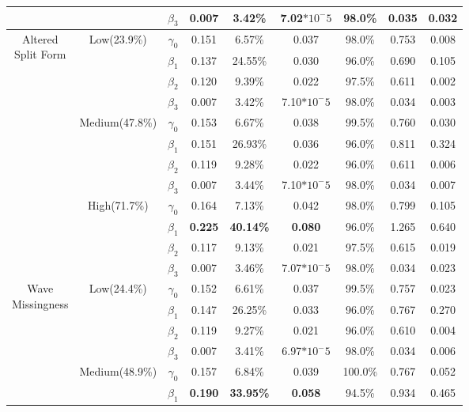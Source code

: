 \documentclass{svjour3}\usepackage[]{graphicx}\usepackage[]{color}
\begin{document}
\begin{table}[p]
\begin{tabular}{c|c|c|cccccc}
		&& $\beta_3$ & 0.007 & 3.42\% & 7.02$*10^-5$ & 98.0\% & 0.035 & 0.032 \\
		\midrule
		\midrule
		\multirow{12}{*}{\parbox{1.75cm}{Altered \\ Split Form}}
		& \multirow{4}{*}{Low(23.9\%)}
		& $\gamma_0$ & 0.151 & 6.57\% & 0.037 & 98.0\% & 0.753 & 0.008 \\
		&& $\beta_1$ & 0.137 & 24.55\% & 0.030 & 96.0\% & 0.690 & 0.105 \\
		&& $\beta_2$ & 0.120 & 9.39\% & 0.022 & 97.5\% & 0.611 & 0.002 \\
		&& $\beta_3$ & 0.007 & 3.42\% & 7.10$*10^-5$ & 98.0\% & 0.034 & 0.003 \\ \cline{2-9} \noalign{\smallskip}
		&\multirow{4}{*}{Medium(47.8\%)}
		& $\gamma_0$ & 0.153 & 6.67\% & 0.038 & 99.5\% & 0.760 & 0.030 \\
		&& $\beta_1$ & 0.151 & 26.93\% & 0.036 & 96.0\% & 0.811 & 0.324 \\
		&& $\beta_2$ & 0.119 & 9.28\% & 0.022 & 96.0\% & 0.611 & 0.006 \\
		&& $\beta_3$ & 0.007 & 3.44\% & 7.10$*10^-5$ & 98.0\% & 0.034 & 0.007 \\ \cline{2-9} \noalign{\smallskip}
		& \multirow{4}{*}{High(71.7\%)}
		& $\gamma_0$ & 0.164 & 7.13\% & 0.042 & 98.0\% & 0.799 & 0.105 \\
		&& $\beta_1$ & \textbf{0.225} & \textbf{40.14\%} & \textbf{0.080} & 96.0\% & 1.265 & 0.640 \\
		&& $\beta_2$ & 0.117 & 9.13\% & 0.021 & 97.5\% & 0.615 & 0.019 \\
		&& $\beta_3$ & 0.007 & 3.46\% & 7.07$*10^-5$ & 98.0\% & 0.034 & 0.023 \\
		\midrule
		\midrule
		\multirow{12}{*}{\parbox{1.75cm}{Wave \\ Missingness}}
		& \multirow{4}{*}{Low(24.4\%)}
		& $\gamma_0$ & 0.152 & 6.61\% & 0.037 & 99.5\% & 0.757 & 0.023 \\
		&& $\beta_1$ & 0.147 & 26.25\% & 0.033 & 96.0\% & 0.767 & 0.270 \\
		&& $\beta_2$ & 0.119 & 9.27\% & 0.021 & 96.0\% & 0.610 & 0.004 \\
		&& $\beta_3$ & 0.007 & 3.41\% & 6.97$*10^-5$ & 98.0\% & 0.034 & 0.006 \\ \cline{2-9} \noalign{\smallskip}
		&\multirow{4}{*}{Medium(48.9\%)}
		& $\gamma_0$ & 0.157 & 6.84\% & 0.039 & 100.0\% & 0.767 & 0.052 \\
		&& $\beta_1$ & \textbf{0.190} & \textbf{33.95\%} & \textbf{0.058} & 94.5\% & 0.934 & 0.465 \\

\end{tabular}
\end{table}
\end{document}
